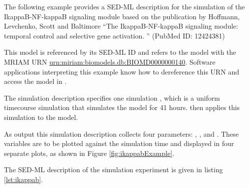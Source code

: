 The following example provides a SED-ML description for the simulation of the IkappaB-NF-kappaB signaling module based on the publication by Hoffmann, Levchenko, Scott and  Baltimore ``The IkappaB-NF-kappaB signaling module: temporal control and selective gene activation. '' (PubMed ID: 12424381)

This model is referenced by its SED-ML ID   and refers to the model with the MRIAM URN \url{urn:miriam:biomodels.db:BIOMD0000000140}. 
Software applications interpreting this example know how to dereference this URN and access the model in \biom \citep{N+06}.

The simulation description specifies one simulation , which is a uniform timecourse simulation that simulates the model for 41 hours.  then applies this simulation to the model. 

As output this simulation description collects four parameters: , ,  and . These variables are to be plotted against the simulation time and displayed in four separate plots, as shown in Figure \ref{fig:ikappabExample}. 
%
%

The SED-ML description of the simulation experiment is given in listing \ref{lst:ikappab}.


